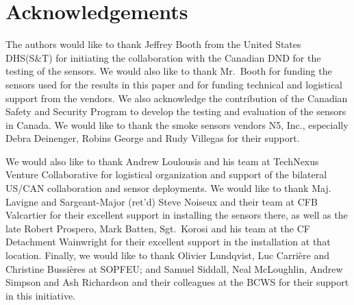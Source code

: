 \documentclass[fire,article,submit,moreauthors]{mdpi}
\begin{document}
\section{Acknowledgements}\label{acknowledgements}

The authors would like to thank Jeffrey Booth from the United States
DHS(S\&T) for initiating the collaboration with the Canadian DND for the
testing of the sensors. We would also like to thank Mr.~Booth for
funding the sensors used for the results in this paper and for funding
technical and logistical support from the vendors. We also acknowledge
the contribution of the Canadian Safety and Security Program to develop
the testing and evaluation of the sensors in Canada. We would like to
thank the smoke sensors vendors N5, Inc., especially Debra Deinenger,
Robins George and Rudy Villegas for their support.

We would also like to thank Andrew Loulousis and his team at TechNexus
Venture Collaborative for logistical organization and support of the
bilateral US/CAN collaboration and sensor deployments. We would like to
thank Maj. Lavigne and Sargeant-Major (ret'd) Steve Noiseux and their
team at CFB Valcartier for their excellent support in installing the
sensors there, as well as the late Robert Prospero, Mark Batten,
Sgt.~Korosi and his team at the CF Detachment Wainwright for their
excellent support in the installation at that location. Finally, we
would like to thank Olivier Lundqvist, Luc Carrière and Christine
Bussières at SOPFEU; and Samuel Siddall, Neal McLoughlin, Andrew Simpson
and Ash Richardson and their colleagues at the BCWS for their support in
this initiative.

\clearpage


\vspace{6pt}



\end{document}
